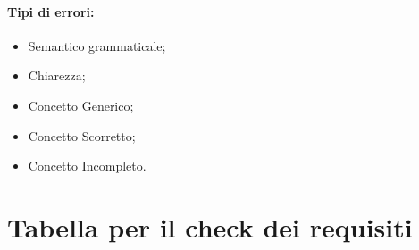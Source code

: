 \subsubsection*{Tipi di errori:}

\begin{itemize}
\item Semantico grammaticale;
\item Chiarezza;
\item Concetto Generico;
\item Concetto Scorretto;
\item Concetto Incompleto.
\end{itemize}

\chapter{Tabella per il check dei requisiti}
\thispagestyle{fancy}

